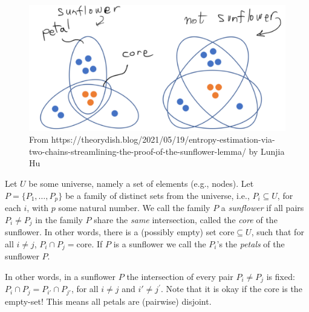 \begin{figure}
    \centering
        \includegraphics[width=0.75\linewidth]{images/sunflower-lemma.png}
    \caption{From https://theorydish.blog/2021/05/19/entropy-estimation-via-two-chains-streamlining-the-proof-of-the-sunflower-lemma/ by Lunjia Hu}
    \label{fig:enter-label}
\end{figure}




\begin{svgraybox}
\begin{definition}[Sunflower] Let $U$ be some universe, namely a set of elements (e.g., nodes). Let $P=\{P_1,\dots,P_p\}$ be a family of distinct sets from the universe, i.e., $P_i\subseteq U$, for each $i$, with $p$ some natural number. 
We call the family $P$ a \emph{sunflower} if  all pairs $P_i \neq P_j$ in the family $P$ share the \emph{same} intersection, called the \emph{core} of the sunflower.
In other words, there is a (possibly empty) set $\mathrm{core}\subseteq U$, such that for all $i\neq j$,  $ P_i\cap P_j = \mathrm{core}$.
If $P$ is a sunflower we call the $P_i$'s the \emph{petals} of the sunflower $P$.
\end{definition}
\end{svgraybox}
In other words, in a sunflower $P$ the intersection of every pair $P_i \neq P_j$ is fixed: $P_i \cap P_j=P_{i'} \cap P_{j'}$, for all $i \neq j $ and $ i' \neq j^{\prime}$.
Note that it is okay if the core is the empty-set! This means all petals are (pairwise) disjoint.


